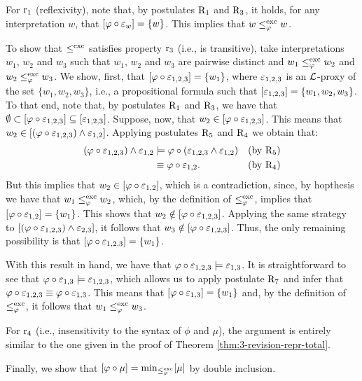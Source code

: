 \begin{prf*}{}{}
	For $\mathrm{r}_{1}$ (reflexivity), note that, by postulates $\mathrm{R}_{1}$ and $\mathrm{R}_{3}$,
	it holds, for any interpretation $w$, that $[\varphi\circ\varepsilon_w]=\{w\}$.
	This implies that $w\le^{\operatorname{exc}}_\varphi w$.
	
	To show that $\le^{\operatorname{exc}}$ satisfies property $\mathrm{r}_{3}$ (i.e., is transitive),
	take interpretations $w_1$, $w_2$ and $w_3$ such that 
	$w_1$, $w_2$ and $w_3$ are pairwise distinct and
	$w_1\le^{\operatorname{exc}}_\varphi w_2$ and $w_2\le^{\operatorname{exc}}_\varphi w_3$. 
	We show, first, that $[\varphi\circ\varepsilon_{1,2,3}]=\{w_1\}$,
	where $\varepsilon_{1,2,3}$ is an $\mathcal{L}$-proxy of the set $\{w_1, w_2,w_3\}$,
	i.e., a propositional formula such that $[\varepsilon_{1,2,3}]=\{w_1,w_2,w_3\}$.
	To that end, note that, by postulates $\mathrm{R}_{1}$ and $\mathrm{R}_{3}$, we have that
	$\emptyset\subset[\varphi\circ\varepsilon_{1,2,3}]\subseteq[\varepsilon_{1,2,3}]$.
	Suppose, now, that $w_2\in[\varphi\circ\varepsilon_{1,2,3}]$.
	This means that $w_2\in[(\varphi\circ\varepsilon_{1,2,3})\land\varepsilon_{1,2}]$.
	Applying postulates $\mathrm{R}_{5}$ and $\mathrm{R}_{4}$ we obtain that:
	\begin{align*}
		(\varphi\circ\varepsilon_{1,2,3})\land\varepsilon_{1,2} &\models\varphi\circ (\varepsilon_{1,2,3}\land\varepsilon_{1,2}) &(\text{by}~\mathrm{R}_{5})\\
													 &\equiv\varphi\circ\varepsilon_{1,2}.                        &(\text{by}~\mathrm{R}_{4}) 
	\end{align*}
	But this implies that $w_2\in[\varphi\circ\varepsilon_{1,2}]$, which is a contradiction,
	since, by hopthesis we have that $w_1\le^{\operatorname{exc}}_\varphi w_2$, which, by the definition of $\le^{\operatorname{exc}}_\varphi$,
	implies that $[\varphi\circ\varepsilon_{1,2}]=\{w_1\}$.
	This shows that $w_2\notin[\varphi\circ\varepsilon_{1,2,3}]$. 
	Applying the same strategy to $[(\varphi\circ\varepsilon_{1,2,3})\land\varepsilon_{2,3}]$,
	it follows that $w_3\notin[\varphi\circ\varepsilon_{1,2,3}]$.
	Thus, the only remaining possibility is that $[\varphi\circ\varepsilon_{1,2,3}]=\{w_1\}$.

	With this result in hand, we have that $\varphi\circ\varepsilon_{1,2,3}\models\varepsilon_{1,3}$.
	It is straightforward to see that $\varphi\circ\varepsilon_{1,3}\models\varepsilon_{1,2,3}$,
	which allows us to apply postulate $\mathrm{R}_{7}$ and infer that $\varphi\circ\varepsilon_{1,2,3}\equiv\varphi\circ\varepsilon_{1,3}$.
	This means that $[\varphi\circ\varepsilon_{1,3}]=\{w_1\}$ and, by the definition of $\le^{\operatorname{exc}}_\varphi$,
	it follows that $w_1\le^{\operatorname{exc}}_\varphi w_3$.

	For $\mathrm{r}_{4}$ (i.e., insensitivity to the syntax of $\phi$ and $\mu$), the argument is entirely similar 
	to the one given in the proof of Theorem \ref{thm:3-revision-repr-total}.

	Finally, we show that $[\varphi\circ\mu]={\operatorname{min}}_{\le^{\operatorname{exc}}_\varphi}[\mu]$ by double inclusion.


\end{prf*}
